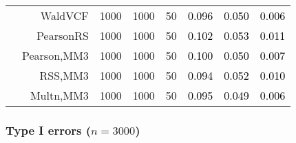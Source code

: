 \documentclass[
]{article}
\begin{document}
\begin{table}[H]
{\begin{tabular}[t]{lrrrrrrr}
\hspace{1em} & WaldVCF & 1000 & 1000 & 50 & \textcolor{black}{0.096} & \textcolor{black}{0.050} & \textcolor{black}{0.006}\\

\hspace{1em} & PearsonRS & 1000 & 1000 & 50 & \textcolor{black}{0.102} & \textcolor{black}{0.053} & \textcolor{black}{0.011}\\

\hspace{1em} & Pearson,MM3 & 1000 & 1000 & 50 & \textcolor{black}{0.100} & \textcolor{black}{0.050} & \textcolor{black}{0.007}\\

\hspace{1em} & RSS,MM3 & 1000 & 1000 & 50 & \textcolor{black}{0.094} & \textcolor{black}{0.052} & \textcolor{black}{0.010}\\

\hspace{1em} & Multn,MM3 & 1000 & 1000 & 50 & \textcolor{black}{0.095} & \textcolor{black}{0.049} & \textcolor{black}{0.006}\\
\bottomrule
\end{tabular}}
\endgroup{}
\end{table}

\hypertarget{type-i-errors-n3000}{%
\subsubsection{\texorpdfstring{Type I errors
(\(n=3000\))}{Type I errors (n=3000)}}\label{type-i-errors-n3000}}
\end{document}
